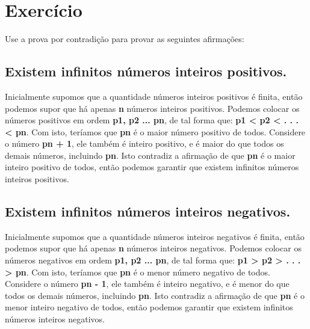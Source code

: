 \documentclass[12pt]{scrartcl}
\begin{document}
\section{Exercício}
Use a prova por contradição para provar as seguintes afirmações:

\subsection{Existem infinitos números inteiros positivos.}
Inicialmente supomos que a quantidade números inteiros positivos é finita,
então podemos supor que há apenas \textbf{n} números inteiros positivos.\newline
Podemos colocar os números positivos em ordem \textbf{p1, p2 ... pn},
de tal forma que:\newline
\textbf{p1 < p2 < . . . < pn}. \newline
Com isto, teríamos que \textbf{pn} é o maior número positivo de todos.\newline
Considere o número \textbf{pn + 1}, ele também é inteiro positivo, e é
maior do que todos os demais números, incluindo \textbf{pn}. Isto contradiz a afirmação de que \textbf{pn} é o maior inteiro positivo de todos, então podemos garantir que existem infinitos números inteiros positivos. 


\subsection{Existem infinitos números inteiros negativos.}
Inicialmente supomos que a quantidade números inteiros negativos é finita,
então podemos supor que há apenas \textbf{n} números inteiros negativos.\newline
Podemos colocar os números negativos em ordem \textbf{p1, p2 ... pn},
de tal forma que:\newline
\textbf{p1 > p2 > . . . > pn}. \newline
Com isto, teríamos que \textbf{pn} é o menor número negativo de todos.\newline
Considere o número \textbf{pn - 1}, ele também é inteiro negativo, e é
menor do que todos os demais números, incluindo \textbf{pn}. Isto contradiz a afirmação de que \textbf{pn} é o menor inteiro negativo de todos, então podemos garantir que existem infinitos números inteiros negativos.
\end{document}
